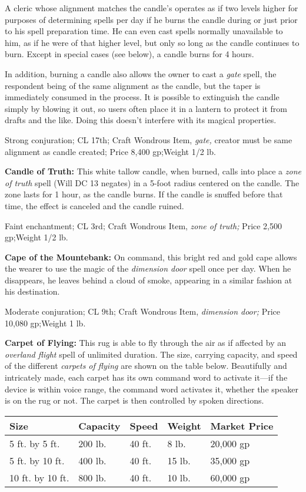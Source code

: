 \documentclass{article}
\begin{document}
A cleric whose alignment matches the candle's operates as if two levels higher 
for purposes of determining spells per day if he burns the candle during or just 
prior to his spell preparation time. He can even cast spells normally unavailable 
to him, as if he were of that higher level, but only so long as the candle continues 
to burn. Except in special cases (see below), a candle burns for 4 hours.

In addition, burning a candle also allows the owner to cast a \textit{gate }spell, 
the respondent being of the same alignment as the candle, but the taper is immediately 
consumed in the process. It is possible to extinguish the candle simply by blowing 
it out, so users often place it in a lantern to protect it from drafts and the 
like. Doing this doesn't interfere with its magical properties.

Strong conjuration; CL 17th; Craft Wondrous Item, \textit{gate, }creator must be 
same alignment as candle created; Price 8,400 gp;Weight 1/2 lb.

\textbf{Candle of Truth:} This white tallow candle, when burned, calls into place 
a \textit{zone of truth }spell (Will DC 13 negates) in a 5-foot radius centered 
on the candle. The zone lasts for 1 hour, as the candle burns. If the candle is 
snuffed before that time, the effect is canceled and the candle ruined.

Faint enchantment; CL 3rd; Craft Wondrous Item, \textit{zone of truth; }Price 2,500 
gp;Weight 1/2 lb.

\textbf{Cape of the Mountebank:} On command, this bright red and gold cape allows 
the wearer to use the magic of the \textit{dimension door }spell once per day. 
When he disappears, he leaves behind a cloud of smoke, appearing in a similar fashion 
at his destination.

Moderate conjuration; CL 9th; Craft Wondrous Item, \textit{dimension door; }Price 
10,080 gp;Weight 1 lb.

\textbf{Carpet of Flying:} This rug is able to fly through the air as if affected 
by an \textit{overland flight }spell of unlimited duration. The size, carrying 
capacity, and speed of the different \textit{carpets of flying }are shown on the 
table below. Beautifully and intricately made, each carpet has its own command 
word to activate it---if the device is within voice range, the command word activates 
it, whether the speaker is on the rug or not. The carpet is then controlled by 
spoken directions.

\begin{tabular}{|>{\raggedright}p{61pt}|>{\raggedright}p{42pt}|>{\raggedright}p{29pt}|>{\raggedright}p{34pt}|>{\raggedright}p{60pt}|}
\hline
S\textbf{ize} & C\textbf{apacity} & S\textbf{peed} & W\textbf{eight} & M\textbf{arket 
Price}\tabularnewline
\hline
5 ft. by 5 ft. & 200 lb. & 40 ft. & 8 lb. & 20,000 gp\tabularnewline
\hline
5 ft. by 10 ft. & 400 lb. & 40 ft. & 15 lb. & 35,000 gp\tabularnewline
\hline
10 ft. by 10 ft. & 800 lb. & 40 ft. & 10 lb. & 60,000 gp\tabularnewline
\hline
\end{tabular}
\end{document}
